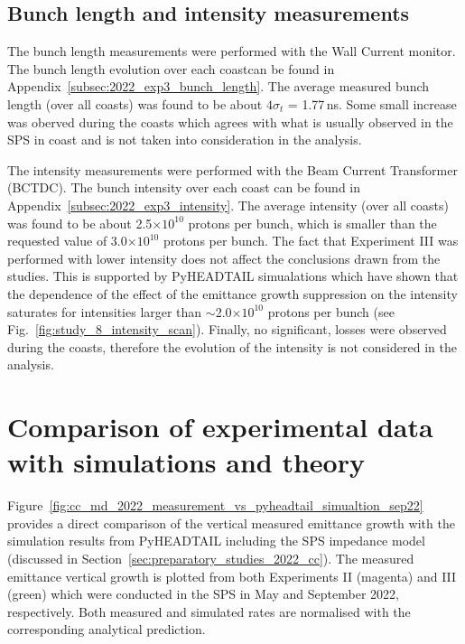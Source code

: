 \subsection{Bunch length and intensity measurements}\label{subsec:bunch_length_intensity_exp3}

The bunch length measurements were performed with the Wall Current monitor. The bunch length evolution over each coastcan be found in Appendix~\ref{subsec:2022_exp3_bunch_length}. The average measured bunch length (over all coasts) was found to be about $4\sigma_t$ = 1.77\,ns. Some small increase was oberved during the coasts which agrees with what is usually observed in the SPS in coast and is not taken into consideration in the analysis. 

The intensity measurements were performed with the Beam Current Transformer (BCTDC). The bunch intensity over each coast can be found in Appendix~\ref{subsec:2022_exp3_intensity}. The average intensity (over all coasts) was found to be about 2.5$\times 10^{10}$ protons per bunch, which is smaller than the requested value of 3.0$\times 10^{10}$ protons per bunch. The fact that Experiment III was performed with lower intensity does not affect the conclusions drawn from the studies. This is supported by PyHEADTAIL simualations which have shown that the dependence of the effect of the emittance growth suppression on the intensity saturates for intensities larger than $\sim$2.0$\times 10^{10}$ protons per bunch (see Fig.~\ref{fig:study_8_intensity_scan}). Finally, no significant, losses were observed during the coasts, therefore the evolution of the intensity is not considered in the analysis.



\section{Comparison of experimental data with simulations and theory}\label{sec:compare_measurements_pyheadtail_theory}

Figure~\ref{fig:cc_md_2022_measurement_vs_pyheadtail_simualtion_sep22} provides a direct comparison of the vertical measured emittance growth with the simulation results from PyHEADTAIL including the SPS impedance model (discussed in Section~\ref{sec:preparatory_studies_2022_cc}). The measured emittance vertical growth is plotted from both Experiments II (magenta) and III (green) which were conducted in the SPS in May and September 2022, respectively. Both measured and simulated rates are normalised with the corresponding analytical prediction.

